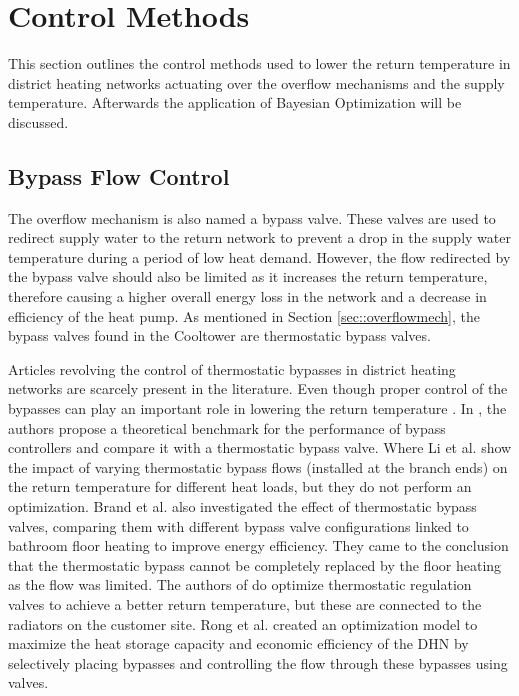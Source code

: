 \chapter{Control Methods}\label{chap::optimization}
This section outlines the control methods used to lower the return temperature in district heating networks actuating over the overflow mechanisms and the supply temperature. Afterwards the application of Bayesian Optimization will be discussed. 

\section{Bypass Flow Control}
The overflow mechanism is also named a bypass valve. These valves are used to redirect supply water to the return network to prevent a drop in the supply water temperature during a period of low heat demand. However, the flow redirected by the bypass valve should also be limited as it increases the return temperature, therefore causing a higher overall energy loss in the network and a decrease in efficiency of the heat pump. As mentioned in Section \ref{sec::overflowmech}, the bypass valves found in the Cooltower are thermostatic bypass valves. 

Articles revolving the control of thermostatic bypasses in district heating networks are scarcely present in the literature. Even though proper control of the bypasses can play an important role in lowering the return temperature \cite{app15062982,VANDERMEULEN201845}. In \cite{VANDERMEULEN201845}, the authors propose a theoretical benchmark for the performance of bypass controllers and compare it with a thermostatic bypass valve. Where Li et al. \cite{DTUlibrary} show the impact of varying thermostatic bypass flows (installed at the branch ends) on the return temperature for different heat loads, but they do not perform an optimization. Brand et al. \cite{BRAND2014256} also investigated the effect of thermostatic bypass valves, comparing them with different bypass valve configurations linked to bathroom floor heating to improve energy efficiency. They came to the conclusion that the thermostatic bypass cannot be completely replaced by the floor heating as the flow was limited. The authors of \cite{BENAKOPOULOS2021120928} do optimize thermostatic regulation valves to achieve a better return temperature, but these are connected to the radiators on the customer site. Rong et al. \cite{RONG2025116197} created an optimization model to maximize the heat storage capacity and economic efficiency of the DHN by selectively placing bypasses and controlling the flow through these bypasses using valves. 

